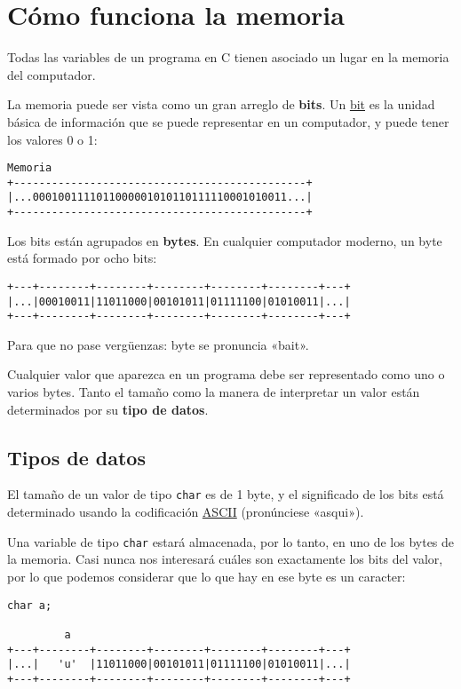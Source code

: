 \chapter{Cómo funciona la memoria}

Todas las variables de un programa en C tienen asociado un lugar en la
memoria del computador.

La memoria puede ser vista como un gran arreglo de \textbf{bits}. Un
\href{http://en.wikipedia.org/wiki/Bit}{bit} es la unidad básica de
información que se puede representar en un computador, y puede tener los
valores 0 o 1:

\begin{verbatim}
Memoria
+----------------------------------------------+
|...0001001111011000001010110111110001010011...|
+----------------------------------------------+
\end{verbatim}

Los bits están agrupados en \textbf{bytes}. En cualquier computador
moderno, un byte está formado por ocho bits:

\begin{verbatim}
+---+--------+--------+--------+--------+--------+---+
|...|00010011|11011000|00101011|01111100|01010011|...|
+---+--------+--------+--------+--------+--------+---+
\end{verbatim}

Para que no pase vergüenzas: byte se pronuncia «bait».

Cualquier valor que aparezca en un programa debe ser representado como
uno o varios bytes. Tanto el tamaño como la manera de interpretar un
valor están determinados por su \textbf{tipo de datos}.

\section{Tipos de datos}

El tamaño de un valor de tipo \lstinline!char! es de 1 byte, y el
significado de los bits está determinado usando la codificación
\href{http://en.wikipedia.org/wiki/ASCII}{ASCII} (pronúnciese «asqui»).

Una variable de tipo \lstinline!char! estará almacenada, por lo tanto,
en uno de los bytes de la memoria. Casi nunca nos interesará cuáles son
exactamente los bits del valor, por lo que podemos considerar que lo que
hay en ese byte es un caracter:

\begin{verbatim}
char a;

         a
+---+--------+--------+--------+--------+--------+---+
|...|   'u'  |11011000|00101011|01111100|01010011|...|
+---+--------+--------+--------+--------+--------+---+
\end{verbatim}

